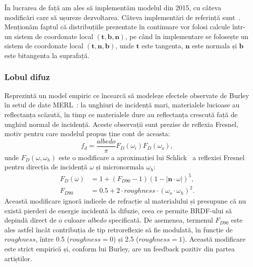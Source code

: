 \documentclass[12pt,a4paper]{report}
\numberwithin{equation}{section} %
\begin{document}
În lucrarea de față am ales să implementăm modelul din 2015, cu câteva modificări
care să ușureze dezvoltarea. Câteva implementări de referință sunt~\cite{DisneyHomework,DisneySchutte,GlslPathTracer}.
Menționăm faptul că distribuțiile prezentate în continuare vor folosi calcule
într-un sistem de coordonate local $(\mathbf{t}, \mathbf{b}, \mathbf{n})$,
pe când în implementare se folosește un sistem de coordonate local $(\mathbf{t}, \mathbf{n}, \mathbf{b})$,
unde $\mathbf{t}$ este tangenta, $\mathbf{n}$ este normala și $\mathbf{b}$ este bitangenta la suprafață.

\subsubsection*{Lobul difuz}
Reprezintă un model empiric ce încearcă să modeleze efectele
observate de Burley în setul de date MERL~\cite{MERL}: la unghiuri de incidență
mari, materialele lucioase au reflectanța scăzută, în timp ce materialele
dure au reflectanța crescută față de unghiul normal de incidență. Aceste
observații sunt prezise de reflexia Fresnel, motiv pentru care modelul propus
ține cont de aceasta:
\begin{equation}\label{eq:brdf_diffuse}
	f_d = \dfrac{albedo}{\pi}F_D(\omega_i)F_D(\omega_o),
\end{equation}
unde $F_D(\omega, \omega_h)$ este o modificare a aproximației lui Schlick~\cite{Schlick} a
reflexiei Fresnel pentru direcția de incidență $\omega$ și micronormala $\omega_h$:
\begin{equation}
	\begin{aligned}\label{eq:f_d}
		F_D(\omega) & = 1 + (F_{D90} - 1)(1 - |\mathbf{n} \cdot \omega|)^5,      \\
		F_{D90}               & = 0.5 + 2\cdot roughness\cdot (\omega_o \cdot \omega_h)^2.
	\end{aligned}
\end{equation}
Această modificare ignoră indicele de refracție al materialului și presupune
că nu există pierderi de energie incidentă la difuzie, ceea ce permite
BRDF-ului să depindă direct de o culoare $albedo$ specificată. De asemenea, termenul $F_{D90}$ este
ales astfel încât contribuția de tip retroreflexie să fie modulată, în funcție
de $roughness$, între 0.5 ($roughness = 0$) și 2.5 ($roughness = 1$). Această
modificare este strict empirică și, conform lui Burley, are un feedback pozitiv
din partea artiștilor.
\end{document}
